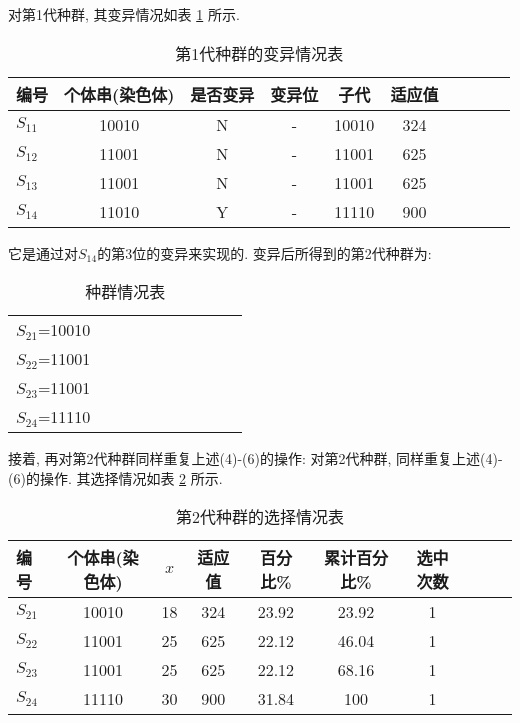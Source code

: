 对第1代种群, 其变异情况如表 \ref{AI_table2019112809} 所示.
\begin{table} [H]
\caption{第1代种群的变异情况表}
\begin{center}
\begin{tabular} {lccccccccc}
  \hline
编号&	个体串(染色体)	&是否变异&	变异位	&子代&	适应值\\
  \hline
$S_{11}$&	10010&	N&	-	&10010&	324\\
$S_{12}$&	11001&	N&	-	&11001&	625\\
$S_{13}$&	11001&	N&-		&11001&	625\\
$S_{14}$&	11010&	Y&-	    &11110&	900\\
\hline
\end{tabular}
\end{center}
\label{AI_table2019112809}
\end{table}
它是通过对$S_{14}$的第3位的变异来实现的. 变异后所得到的第2代种群为:
\begin{table} [H]
\caption{种群情况表}
\begin{center}
\begin{tabular} {lccccccccc}
\hline
$S_{21}$=10010\\
$S_{22}$=11001\\
$S_{23}$=11001\\
$S_{24}$=11110\\
\hline
\end{tabular}
\end{center}
\end{table}
接着, 再对第2代种群同样重复上述(4)-(6)的操作:
对第2代种群, 同样重复上述(4)-(6)的操作. 其选择情况如表 \ref{AI_table2019112810} 所示.
\begin{table} [H]
\caption{第2代种群的选择情况表}
\begin{center}
\begin{tabular} {lccccccccc}
  \hline
编号	&个体串(染色体)&	$x$	&适应值	&百分比\%	&累计百分比\%	&选中次数\\
  \hline
$S_{21}$&	10010&	18	&324	&23.92	&23.92	&1\\
$S_{22}$&11001&	25	&625	&22.12	&46.04	&1\\
$S_{23}$	&11001&	25	&625	&22.12	&68.16	&1\\
$S_{24}$ &11110 &30	&900	&31.84&	100&1\\
\hline
\end{tabular}
\end{center}
\label{AI_table2019112810}
\end{table}
